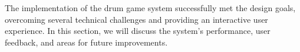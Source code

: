 \documentclass{subfile}
\begin{document}
The implementation of the drum game system successfully met the design goals, overcoming several technical challenges and providing an interactive user experience. In this section, we will discuss the system's performance, user feedback, and areas for future improvements.
\end{document}
